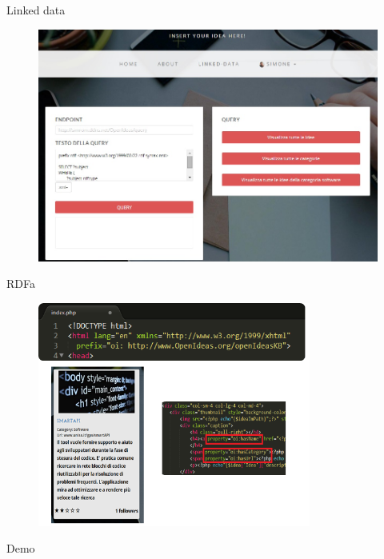 \documentclass{beamer}
\begin{document}
\begin{frame}{Linked data}
	
	\begin{figure}
		\centering
			\includegraphics[width=1.00\textwidth]{img/linkedData.jpg}
		\label{fig:linkedData}
	\end{figure}
	
\end{frame}

\begin{frame}{RDFa}
	
	\begin{figure}
		\centering
			\includegraphics[width=0.8\textwidth]{img/rdfa.png}
		\label{fig:rdfa}
	\end{figure}
	
\end{frame}


\begin{frame}{Demo}
	
	\begin{center}
		\href{http://localhost/WebSemantico/OpenIdeas/index.php}{}
	\end{center}
\end{frame}
\end{document}
